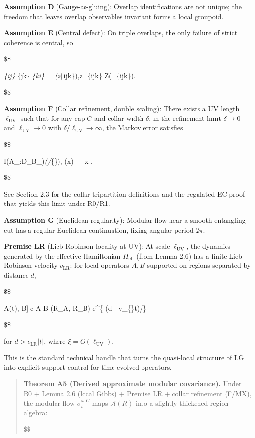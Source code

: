 \documentclass[11pt,a4paper]{article}
\theoremstyle{remark}
\begin{document}
\textbf{Assumption D} (Gauge-as-gluing): Overlap identifications are not unique; the
freedom that leaves overlap observables invariant forms a local groupoid.

\textbf{Assumption E} (Central defect): On triple overlaps, the only failure of strict
coherence is central, so

\$\$

\varphi\emph{\{ij\} \varphi}\{jk\} \varphi\emph{\{ki\} = (z}\{ijk\}),\qquad z\_\{ijk\} \in Z(\_\{ijk\}).

\$\$

\textbf{Assumption F} (Collar refinement, double scaling): There exists a UV length
\(\ell_{\mathrm{UV}}\) such that for any cap \(C\) and collar width \(\delta\), in the refinement limit
\(\delta \to 0\) and \(\ell_{\mathrm{UV}} \to 0\) with \(\delta/\ell_{\mathrm{UV}} \to \infty\), the Markov error
satisfies

\$\$

I(A\_\delta:D\_\delta \mid B\_\delta)\emph{\omega \le \varepsilon(\delta/\ell}\{\}),
\qquad \varepsilon(x)  ~ ~x \to \infty.

\$\$

See Section 2.3 for the collar tripartition definitions and the regulated EC
proof that yields this limit under R0/R1.

\textbf{Assumption G} (Euclidean regularity): Modular flow near a smooth entangling cut
has a regular Euclidean continuation, fixing angular period \(2\pi\).

\textbf{Premise LR} (Lieb-Robinson locality at UV): At scale \(\ell_{\mathrm{UV}}\), the
dynamics generated by the effective Hamiltonian \(H_{\mathrm{eff}}\) (from Lemma 2.6)
has a finite Lieb-Robinson velocity \(v_{\mathrm{LR}}\): for local operators \(A, B\)
supported on regions separated by distance \(d\),

\$\$

\textbar{[}A(t), B{]}\textbar{} \le c \textbar A\textbar{} \textbar B\textbar{} \min(\textbar R\_A\textbar, \textbar R\_B\textbar) e\^{}\{-(d - v\_\{\}\textbar t\textbar)/\xi\}

\$\$

for \(d > v_{\mathrm{LR}}|t|\), where \(\xi = O(\ell_{\mathrm{UV}})\).

This is the standard technical handle that turns the quasi-local structure of
LG into explicit support control for time-evolved operators.

\begin{quote}
\textbf{Theorem A5 (Derived approximate modular covariance).} Under R0 + Lemma 2.6
(local Gibbs) + Premise LR + collar refinement (F/MX), the modular flow
\(\sigma_t^{\omega,C}\) maps \(\mathcal{A}(R)\) into a slightly thickened region
algebra:

\$\$
\end{quote}
\end{document}
